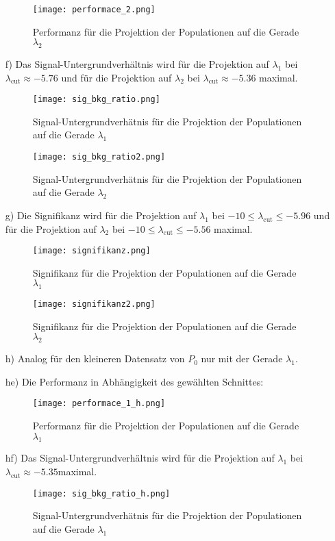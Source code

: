 \begin{itemize}
\begin{figure}[H]
\end{figure}
\begin{figure}[H]
	\centering
	\texttt{[image: performace\_2.png]}
	\caption{Performanz für die Projektion der Populationen auf die Gerade $\lambda_2$}
\end{figure}
\item[f)] Das Signal-Untergrundverhältnis wird für die Projektion auf $\lambda_1$ bei $\lambda_{\text{cut}}\approx -5.76$ und für die Projektion auf $\lambda_2$ bei $\lambda_{\text{cut}}\approx -5.36$ maximal.
\begin{figure}[H]
	\centering
	\texttt{[image: sig\_bkg\_ratio.png]}
	\caption{Signal-Untergrundverhätnis für die Projektion der Populationen auf die Gerade $\lambda_1$}
\end{figure}
\begin{figure}[H]
	\centering
	\texttt{[image: sig\_bkg\_ratio2.png]}
	\caption{Signal-Untergrundverhätnis für die Projektion der Populationen auf die Gerade $\lambda_2$}
\end{figure}

\item[g)] Die Signifikanz wird für die Projektion auf $\lambda_1$ bei $-10 \leq \lambda_{\text{cut}} \leq -5.96$ und für die Projektion auf $\lambda_2$ bei $-10 \leq \lambda_{\text{cut}} \leq -5.56$ maximal.
\begin{figure}[H]
	\centering
	\texttt{[image: signifikanz.png]}
	\caption{Signifikanz für die Projektion der Populationen auf die Gerade $\lambda_1$}
\end{figure}
\begin{figure}[H]
	\centering
	\texttt{[image: signifikanz2.png]}
	\caption{Signifikanz für die Projektion der Populationen auf die Gerade $\lambda_2$}
\end{figure}

\item[h)] Analog für den kleineren Datensatz von $P_0$ nur mit der Gerade $\lambda_1$.

\item[he)] Die Performanz in Abhängigkeit des gewählten Schnittes:
\begin{figure}[H]
	\centering
	\texttt{[image: performace\_1\_h.png]}
	\caption{Performanz für die Projektion der Populationen auf die Gerade $\lambda_1$}
\end{figure}

\item[hf)] Das Signal-Untergrundverhältnis wird für die Projektion auf $\lambda_1$ bei $\lambda_{\text{cut}}\approx -5.35$maximal.
\begin{figure}[H]
	\centering
	\texttt{[image: sig\_bkg\_ratio\_h.png]}
	\caption{Signal-Untergrundverhätnis für die Projektion der Populationen auf die Gerade $\lambda_1$}
\end{figure}



\end{itemize}
